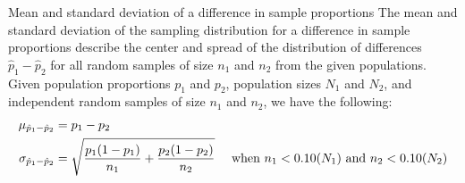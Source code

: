 \begin{onebox}{Mean and standard deviation of a difference in sample proportions}
The mean and standard deviation of the sampling distribution for a difference in sample proportions describe the center and spread of the distribution of differences $\hat{p}_1-\hat{p}_2$ for all random samples of size $n_1$ and $n_2$ from the given populations.  Given population proportions $p_1$ and $p_2$, population sizes $N_1$ and $N_2$, and independent random samples of size $n_1$ and $n_2$, we have the following:
\begin{align*}
\mu_{\hat{p}_1-\hat{p}_2} &= p_1-p_2\\
 \sigma_{\hat{p}_1-\hat{p}_2}&=  \sqrt{\frac{p_1(1-p_1)}{n_1} + \frac{p_2(1-p_2)}{n_2}} \quad \text{ when } n_1<0.10(N_1) \text{ and } n_2<0.10(N_2) 
	\vspace{1mm}
\end{align*}
\end{onebox}

%

